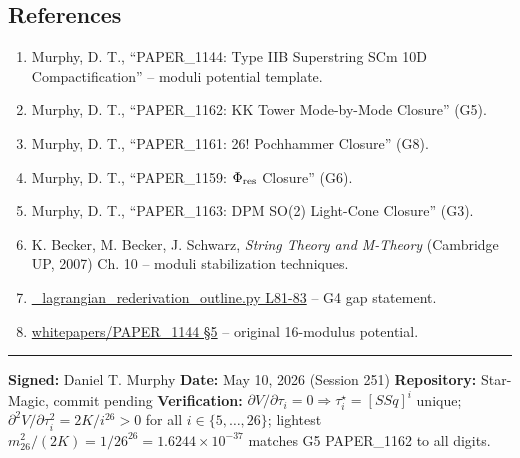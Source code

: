 \documentclass[
]{article}
\providecommand{\tightlist}{%
  \setlength{\itemsep}{0pt}\setlength{\parskip}{0pt}}
\begin{document}
\subsection{References}\label{references}

\begin{enumerate}
\def\labelenumi{\arabic{enumi}.}
\tightlist
\item
  Murphy, D. T., ``PAPER\_1144: Type IIB Superstring SCm 10D
  Compactification'' -- moduli potential template.
\item
  Murphy, D. T., ``PAPER\_1162: KK Tower Mode-by-Mode Closure'' (G5).
\item
  Murphy, D. T., ``PAPER\_1161: 26! Pochhammer Closure'' (G8).
\item
  Murphy, D. T., ``PAPER\_1159: \(\Phi_{\rm res}\) Closure'' (G6).
\item
  Murphy, D. T., ``PAPER\_1163: DPM SO(2) Light-Cone Closure'' (G3).
\item
  K. Becker, M. Becker, J. Schwarz, \emph{String Theory and M-Theory}
  (Cambridge UP, 2007) Ch. 10 -- moduli stabilization techniques.
\item
  \href{_lagrangian_rederivation_outline.py\#L81}{\_lagrangian\_rederivation\_outline.py
  L81-83} -- G4 gap statement.
\item
  \href{whitepapers/PAPER_1144_Type_IIB_Superstring_SCm_10D_Compactification.md\#L62}{whitepapers/PAPER\_1144
  §5} -- original 16-modulus potential.
\end{enumerate}

\begin{center}\rule{0.5\linewidth}{0.5pt}\end{center}

\textbf{Signed:} Daniel T. Murphy \textbf{Date:} May 10, 2026 (Session
251) \textbf{Repository:} Star-Magic, commit pending
\textbf{Verification:}
\(\partial V/\partial \tau_i = 0 \Rightarrow \tau_i^\star
= [SSq]^i\) unique; \(\partial^2 V/\partial \tau_i^2 = 2K/i^{26} > 0\)
for all \(i \in \{5,\dots,26\}\); lightest \(m_{26}^2/(2K) = 1/26^{26}
= 1.6244\times 10^{-37}\) matches G5 PAPER\_1162 to all digits.




\end{document}

